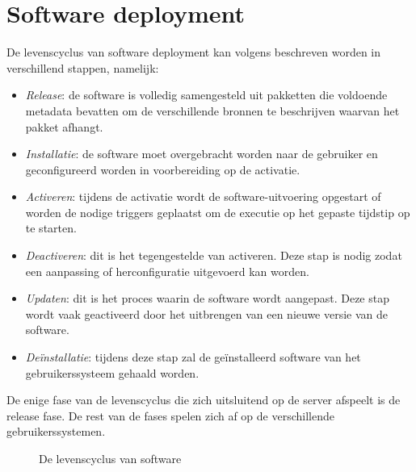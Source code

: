 \section{Software deployment}\label{sec:softwareLevenscyclus}
De levenscyclus van software deployment kan volgens \citet{softwareDeployment,hall1999cooperative} beschreven worden in verschillend stappen, namelijk:
\begin{itemize}
\item \emph{Release}: de software is volledig samengesteld uit pakketten die voldoende metadata bevatten om de verschillende bronnen te beschrijven waarvan het pakket afhangt.
\item \emph{Installatie}: de software moet overgebracht worden naar de gebruiker en geconfigureerd worden in voorbereiding op de activatie.
\item \emph{Activeren}: tijdens de activatie wordt de software-uitvoering opgestart of worden de nodige triggers geplaatst om de executie op het gepaste tijdstip op te starten.
\item \emph{Deactiveren}: dit is het tegengestelde van activeren. Deze stap is nodig zodat een aanpassing of herconfiguratie uitgevoerd kan worden.
\item \emph{Updaten}: dit is het proces waarin de software wordt aangepast. Deze stap wordt vaak geactiveerd door het uitbrengen van een nieuwe versie van de software.
\item \emph{Deïnstallatie}: tijdens deze stap zal de geïnstalleerd software van het gebruikerssysteem gehaald worden.
\end{itemize}
De enige fase van de levenscyclus die zich uitsluitend op de server afspeelt is de release fase.
De rest van de fases spelen zich af op de verschillende gebruikerssystemen.

\begin{figure}[!ht]
\centering
{}
\caption{De levenscyclus van software \citep{carzaniga1998characterization}}
\label{fig:softwareLevenscyclus}
\end{figure}

